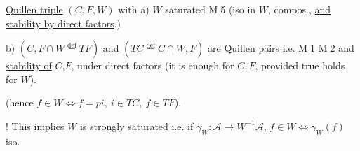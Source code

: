  \uline{Quillen triple} $(C,F,W)$ with a) $W$  saturated \textcircled{M5} (iso  in $W$,   compos., \uline{and stability by direct factors}.)


b) $(C,F\cap W\overset{\mathrm{def}}=TF)$ and $(TC\overset{\mathrm{def}}=C\cap W,F)$ are Quillen pairs i.e. \textcircled{M1} \textcircled{M2} and \uline{stability of} \textcircled{$C$},\textcircled{$F$},    under direct factors (it is enough for $C,F$, provided true holds for \textcircled{$W$}).


(hence  $f\in W\Longleftrightarrow f=pi,\ i\in TC,\ f\in TF$).

! This implies $W$ is strongly saturated i.e. if $\gamma_W:\mathscr A\to W^{-1}\mathscr A$, $f\in W\Longleftrightarrow \gamma_W(f)$ iso.
